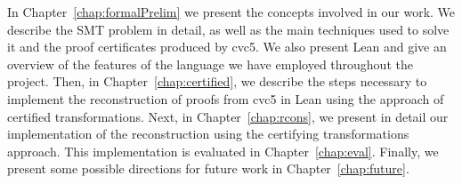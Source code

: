 In Chapter~\ref{chap:formalPrelim} we present the concepts involved in our work.
We describe the SMT problem in detail, as well as the main techniques used to solve
it and the proof certificates produced by cvc5. We also present Lean and give
an overview of the features of the language we have employed throughout the project.
%
Then, in Chapter~\ref{chap:certified}, we describe the steps necessary to implement
the reconstruction of proofs from cvc5 in Lean using the approach of certified
transformations.
%
Next, in Chapter~\ref{chap:rcons}, we present in detail our implementation of the
reconstruction using the certifying transformations approach.
%
This implementation is evaluated in Chapter~\ref{chap:eval}.
%
Finally, we present some possible directions for future work in
Chapter~\ref{chap:future}.
